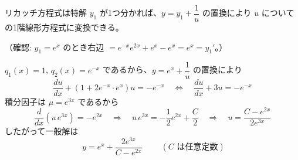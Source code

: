 
リカッチ方程式は特解 $y_{1}$ が1つ分かれば、$y = y_{1} + \dfrac{1}{u}$ の置換により $u$ についての1階線形方程式に変換できる。

（確認: $y_{1} = e^{x}$ のとき右辺 $= e^{-x}e^{2x} + e^{x} - e^{x} = e^{x} = y_{1}'$。）

$q_{1}(x) = 1$, $q_{2}(x) = e^{-x}$ であるから、$y = e^{x} + \dfrac{1}{u}$ の置換により
\[
\frac{du}{dx} + \left(1 + 2e^{-x}\cdot e^{x}\right)u = -e^{-x}
\quad\Longleftrightarrow\quad
\frac{du}{dx} + 3u = -e^{-x}
\]
積分因子は $\mu = e^{3x}$ であるから
\[
\frac{d}{dx}\left(u\,e^{3x}\right) = -e^{2x}
\quad\Longrightarrow\quad
u\,e^{3x} = -\frac{1}{2}e^{2x} + \frac{C}{2}
\quad\Longrightarrow\quad
u = \frac{C - e^{2x}}{2e^{3x}}
\]
したがって一般解は
\[
\boxed{\; y = e^{x} + \frac{2e^{3x}}{C - e^{2x}} \;}
\qquad (C \text{ は任意定数})
\]
